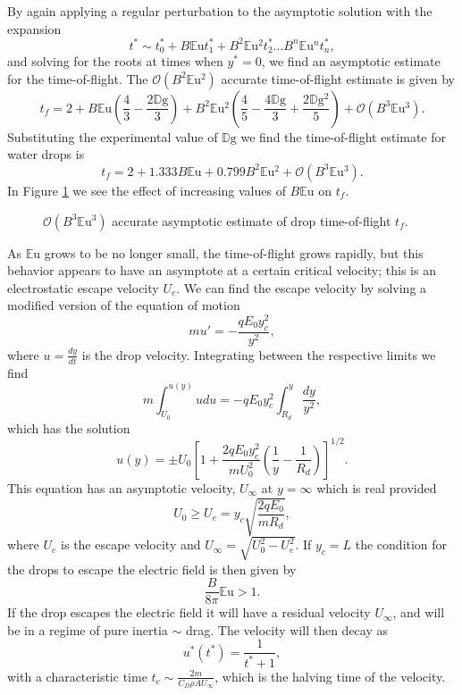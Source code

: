 \documentclass[12pt,a4paper,oneside]{book}
\begin{document}
By again applying a regular perturbation to the asymptotic solution with the expansion
\[ t^* \sim t^*_0 + B \mathbb{E}\mbox{u} t^*_1 + B^2 \mathbb{E}\mbox{u}^2 t^*_2 \ldots B^n \mathbb{E}\mbox{u}^n t^*_n  
,\]
and solving for the roots at times when $y^* = 0$, we find an asymptotic estimate for the time-of-flight. The $\mathcal{O}(B^2 \mathbb{E}\mbox{u}^2)$ accurate time-of-flight estimate is given by
\[t_f = 2 + B \mathbb{E}\mbox{u} \left(\frac{4}{3} - \frac{2 \mathbb{D}\mbox{g}}{3}\right) + B^2 \mathbb{E}\mbox{u}^{2} \left(\frac{4}{5} - \frac{4 \mathbb{D}\mbox{g}}{3} + \frac{2 \mathbb{D}\mbox{g}^{2}}{5}\right) + \mathcal{O}(B^3 \mathbb{E}\mbox{u}^3).\]
Substituting the experimental value of $\mathbb{D}\mbox{g}$ we find the time-of-flight estimate for water drops is
\begin{equation} \label{time_of_flight}
t_f = 2 + 1.333 B \mathbb{E}\mbox{u} + 0.799 B^2 \mathbb{E}\mbox{u}^{2} + \mathcal{O}(B^3 \mathbb{E}\mbox{u}^3). 
\end{equation} 
In Figure \ref{fig:drag} we see the effect of increasing values of $B \mathbb{E}\mbox{u}$ on $t_f$.
\begin{figure}[htb]
    \centering
    
    \caption{$\mathcal{O}(B^3 \mathbb{E}\mbox{u}^3)$ accurate asymptotic estimate of drop time-of-flight $t_f$.}
    \label{fig:drag}
\end{figure}
As $\mathbb{E}\mbox{u}$ grows to be no longer small, the time-of-flight grows rapidly, but this behavior appears to have an asymptote at a certain critical velocity; this is an electrostatic escape velocity $U_e$. We can find the escape velocity by solving a modified version of the equation of motion
\[ m u' = - \frac{q E_0 y_c^2}{y^2}, \]
where $u = \frac{d y}{d t}$ is the drop velocity. Integrating between the respective limits we find
\[m \int^{u(y)}_{U_0} u du = -q E_0 y_c^2 \int^y_{R_d} \frac{dy}{y^2} ,\]
which has the solution
\[ u(y) = \pm U_0 \left[1 + \frac{2q E_0 y_c^2}{m U_0^2} \left( \frac{1}{y} - \frac{1}{R_d} \right) \right]^{1/2}.
\]
This equation has an asymptotic velocity, $U_{\infty}$ at $y = \infty$ which is real provided 
\[ U_0 \geq  U_e = y_c \sqrt{\frac{2 q E_0 }{m R_d}},
\]
where $U_e$ is the escape velocity and $U_{\infty} = \sqrt{U_0^2 - U_e^2}$. If $y_c=L$ the condition for the drops to escape the electric field is then given by
\begin{equation}\label{escape}
\frac{B}{8 \pi} \mathbb{E}\mbox{u} > 1.
\end{equation}
If the drop escapes the electric field it will have a residual velocity $U_{\infty}$, and will be in a regime of pure inertia $\sim$ drag. The velocity will then decay as
\[
u^*(t^*) = \frac{1}{t^* + 1},
\]
with a characteristic time $t_c \sim \frac{2 m}{C_D \rho A U_{\infty}}$, which is the halving time of the velocity.
\end{document}
